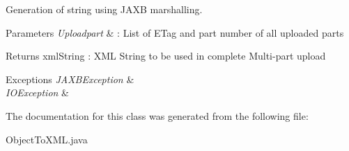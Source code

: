 Generation of string using J\+A\+XB marshalling. 


\begin{DoxyParams}{Parameters}
{\em Uploadpart} & \+: List of E\+Tag and part number of all uploaded parts \\
\hline
\end{DoxyParams}
\begin{DoxyReturn}{Returns}
xml\+String \+: X\+ML String to be used in complete Multi-\/part upload 
\end{DoxyReturn}

\begin{DoxyExceptions}{Exceptions}
{\em J\+A\+X\+B\+Exception} & \\
\hline
{\em I\+O\+Exception} & \\
\hline
\end{DoxyExceptions}


The documentation for this class was generated from the following file\+:\begin{DoxyCompactItemize}
\item 
Object\+To\+X\+M\+L.\+java\end{DoxyCompactItemize}
